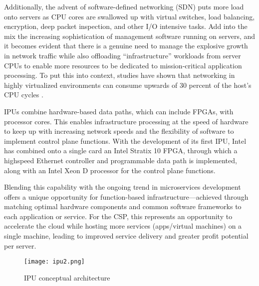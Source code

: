 \documentclass[../sn.tex]{subfiles}
\begin{document}
Additionally, the advent of software-defined networking (SDN)
puts more load onto servers as CPU cores are swallowed up with
virtual switches, load balancing, encryption, deep packet
inspection, and other I/O intensive tasks.
Add into the mix the increasing sophistication of management
software running on servers, and it becomes evident that there
is a genuine need to manage the explosive growth in network
traffic while also offloading “infrastructure” workloads from
server CPUs to enable more resources to be dedicated to
mission-critical application processing.
To put this into context, studies have shown that networking in
highly virtualized environments can consume upwards of 30
percent of the host's CPU cycles \cite{evaleng}.

IPUs combine hardware-based data paths, which can include
FPGAs, with processor cores. This enables infrastructure processing
at the speed of hardware to keep up with increasing network speeds
and the flexibility of software to implement control plane functions.
With the development of its first IPU, Intel has combined onto a
single card an Intel Stratix 10 FPGA, through which a highspeed Ethernet controller and programmable data path is
implemented, along with an Intel Xeon D processor for the
control plane functions.

Blending this capability with the ongoing trend in microservices
development offers a unique opportunity for function-based
infrastructure—achieved through matching optimal hardware
components and common software frameworks to each
application or service. For the CSP, this represents an opportunity to accelerate the
cloud while hosting more services (apps/virtual machines) on a
single machine, leading to improved service delivery and greater
profit potential per server.
\begin{center}
    \begin{figure}
        \centering
        \texttt{[image: ipu2.png]}
        \caption{IPU conceptual architecture}
    \end{figure}
\end{center}
\end{document}
